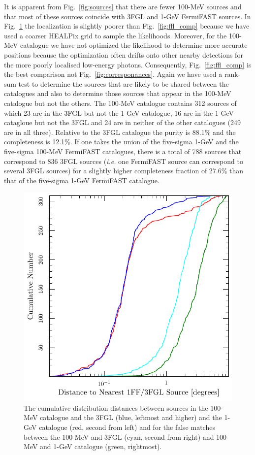 \documentclass[useAMS,usenatbib]{mn2e}
\begin{document}
It is apparent from Fig.~\ref{fig:sources} that there are fewer
100-MeV sources and that most of these sources coincide with 3FGL and
1-GeV FermiFAST sources.  In Fig.~\ref{fig:cum0.1GeV} the localization
is slightly poorer than Fig.~\ref{fig:ffl_comp} because we have used a
coarser HEALPix grid to sample the likelihoods. Moreover, for the 100-MeV
catalogue we have not optimized the likelihood to determine more
accurate positions because the optimization often drifts onto other
nearby detections for the more poorly localised low-energy photons.
Consequently, Fig.~\ref{fig:ffl_comp} is the best comparison
not Fig.~\ref{fig:corresponances}.  Again we have used a rank-sum test
to determine the sources that are likely to be shared between the
catalogues and also to determine those sources that appear in the
100-MeV catalogue but not the others.  The 100-MeV catalogue contains
312 sources of which 23 are in the 3FGL but not the 1-GeV catalogue,
16 are in the 1-GeV catagloue but not the 3FGL and 24 are in neither
of the other catalogues (249 are in all three). Relative to the 3FGL catalogue
the purity is 88.1\% and the completeness is 12.1\%. If one takes the
union of the five-sigma 1-GeV and the five-sigma 100-MeV FermiFAST
catalogues, there is a total of 788 sources that correspond to 836
3FGL sources ({\em i.e.} one FermiFAST source can correspond to
several 3FGL sources) for a slightly higher completeness fraction of
27.6\% than that of the five-sigma 1-GeV FermiFAST catalogue.

\begin{figure}
  \includegraphics[width=\columnwidth]{cum0p1GeV}
  \caption{The cumulative distribution distances between sources in
    the 100-MeV catalogue and the 3FGL (blue, leftmost and higher) and
    the 1-GeV catalogue (red, second from left) and for the false
    matches between the 100-MeV and 3FGL (cyan, second from right) and
    100-MeV and 1-GeV catalogue (green, rightmost).}
  \label{fig:cum0.1GeV}
\end{figure}
\end{document}
